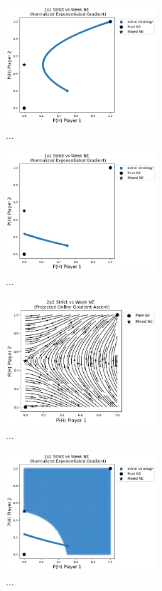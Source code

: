 \begin{figure}
    \centering
    \includegraphics[width=0.5\textwidth]{logos/Weak3.png}
    \caption{...}
    \label{fig:Weak3}
\end{figure}

\begin{figure}
    \centering
    \includegraphics[width=0.5\textwidth]{logos/Weak4.png}
    \caption{...}
    \label{fig:Weak4}
\end{figure}

\begin{figure}
    \centering
    \includegraphics[width=0.5\textwidth]{logos/Weak5.png}
    \caption{...}
    \label{fig:Weak5}
\end{figure}

\begin{figure}
    \centering
    \includegraphics[width=0.5\textwidth]{logos/Weak6.png}
    \caption{...}
    \label{fig:Weak6}
\end{figure}


